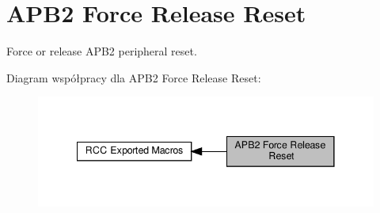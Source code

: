 \hypertarget{group___r_c_c___a_p_b2___force___release___reset}{}\section{A\+P\+B2 Force Release Reset}
\label{group___r_c_c___a_p_b2___force___release___reset}


Force or release A\+P\+B2 peripheral reset.  


Diagram współpracy dla A\+P\+B2 Force Release Reset\+:\nopagebreak
\begin{figure}[H]
\begin{center}
\leavevmode
\includegraphics[width=341pt]{group___r_c_c___a_p_b2___force___release___reset}
\end{center}
\end{figure}
